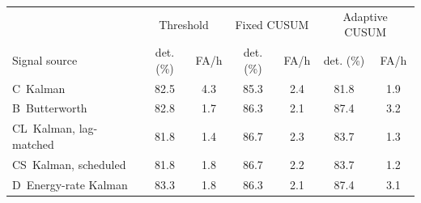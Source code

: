 \begin{tabular}{@{}lcccccc@{}}
\toprule
 & \multicolumn{2}{c}{Threshold} & \multicolumn{2}{c}{Fixed CUSUM} & \multicolumn{2}{c}{Adaptive CUSUM} \\
Signal source & det. (\%) & FA/h & det. (\%) & FA/h & det. (\%) & FA/h \\
\midrule
C~Kalman & 82.5 & 4.3 & 85.3 & 2.4 & 81.8 & 1.9 \\
B~Butterworth & 82.8 & 1.7 & 86.3 & 2.1 & 87.4 & 3.2 \\
CL~Kalman, lag-matched & 81.8 & 1.4 & 86.7 & 2.3 & 83.7 & 1.3 \\
CS~Kalman, scheduled & 81.8 & 1.8 & 86.7 & 2.2 & 83.7 & 1.2 \\
D~Energy-rate Kalman & 83.3 & 1.8 & 86.3 & 2.1 & 87.4 & 3.1 \\
\bottomrule
\end{tabular}
